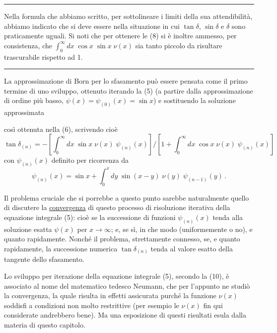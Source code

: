 \documentclass[11pt, a4paper]{book}
\numberwithin{equation}{section}
\begin{document}
\noindent\rule{\linewidth}{0.4pt}

Nella formula che abbiamo scritto, per sottolineare i limiti della sua attendibilità, abbiamo indicato che si deve essere nella situazione in cui $\tan\delta$, $\sin\delta$ e $\delta$ sono praticamente uguali. Si noti che per ottenere le (8) si è inoltre ammesso, per consistenza, che $\int_0^\infty dx\;\cos x\;\sin x\;\nu(x)$ sia tanto piccolo da risultare trascurabile rispetto ad 1.

\noindent\rule{\linewidth}{0.4pt}

La approssimazione di Born per lo sfasamento può essere pensata come il primo termine di uno sviluppo, ottenuto iterando la (5) (a partire dalla approssimazione di ordine più basso, $\psi(x) = \psi_{(0)}(x) = \sin x$) e sostituendo la soluzione approssimata


così ottenuta nella (6), scrivendo cioè
\begin{equation}
\tan\delta_{(n)} = -\left[\int_0^{\infty} dx\;\sin x\;\nu(x)\;\psi_{(n)}(x)\right]\Bigg/\left[1 + \int_0^{\infty} dx\;\cos x\;\nu(x)\;\psi_{(n)}(x)\right] \tag{9}
\end{equation}
con $\psi_{(n)}(x)$ definito per ricorrenza da
\begin{equation}
\psi_{(n)}(x) = \sin x + \int_0^x dy\;\sin(x-y)\;\nu(y)\;\psi_{(n-1)}(y)\,. \tag{10}
\end{equation}

Il problema cruciale che si porrebbe a questo punto sarebbe naturalmente quello di discutere la \underline{convergenza} di questo processo di risoluzione iterativa della equazione integrale (5): cioè se la successione di funzioni $\psi_{(n)}(x)$ tenda alla soluzione esatta $\psi(x)$ per $x \to \infty$; e, se sì, in che modo (uniformemente o no), e quanto rapidamente. Nonché il problema, strettamente connesso, se, e quanto rapidamente, la successione numerica $\tan\delta_{(n)}$ tenda al valore esatto della tangente dello sfasamento.

Lo sviluppo per iterazione della equazione integrale (5), secondo la (10), è associato al nome del matematico tedesco Neumann, che per l'appunto ne studiò la convergenza, la quale risulta in effetti assicurata purché la funzione $\nu(x)$ soddisfi a condizioni non molto restrittive (per esempio le $\nu(x)$ fin qui considerate andrebbero bene). Ma una esposizione di questi risultati esula dalla materia di questo capitolo.
\end{document}

